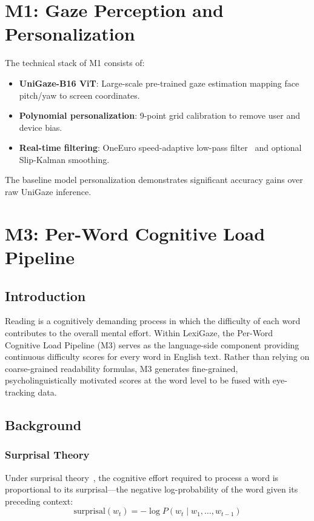 \documentclass[sigconf]{acmart}
\begin{document}
\section{M1: Gaze Perception and Personalization}
The technical stack of M1 consists of:
\begin{itemize}
    \item \textbf{UniGaze-B16 ViT}: Large-scale pre-trained gaze estimation mapping face pitch/yaw to screen coordinates.
    \item \textbf{Polynomial personalization}: 9-point grid calibration to remove user and device bias.
    \item \textbf{Real-time filtering}: OneEuro speed-adaptive low-pass filter~\cite{casiez2012one} and optional Slip-Kalman smoothing.
\end{itemize}
The baseline model personalization demonstrates significant accuracy gains over raw UniGaze inference.

\section{M3: Per-Word Cognitive Load Pipeline}
\subsection{Introduction}
Reading is a cognitively demanding process in which the difficulty of each word contributes to the overall mental effort. Within LexiGaze, the Per-Word Cognitive Load Pipeline (M3) serves as the language-side component providing continuous difficulty scores for every word in English text. Rather than relying on coarse-grained readability formulas, M3 generates fine-grained, psycholinguistically motivated scores at the word level to be fused with eye-tracking data.

\subsection{Background}
\subsubsection{Surprisal Theory}
Under surprisal theory~\cite{hale2001probabilistic, levy2008expectation}, the cognitive effort required to process a word is proportional to its surprisal---the negative log-probability of the word given its preceding context:
\begin{equation}
\text{surprisal}(w_t) = -\log P(w_t \mid w_1, \ldots, w_{t-1})
\end{equation}
\end{document}
